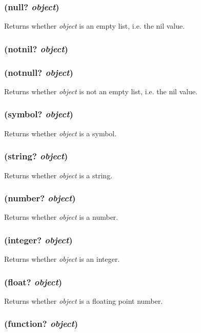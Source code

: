 \documentclass{article}
\begin{document}
\subsubsection{(null? \emph{object})}

Returns whether \emph{object} is an empty list, i.e. the nil value.

\subsubsection{(notnil? \emph{object})}

\subsubsection{(notnull? \emph{object})}

Returns whether \emph{object} is not an empty list, i.e. the nil value.

\subsubsection{(symbol? \emph{object})}

Returns whether \emph{object} is a symbol.

\subsubsection{(string? \emph{object})}

Returns whether \emph{object} is a string.

\subsubsection{(number? \emph{object})}

Returns whether \emph{object} is a number.

\subsubsection{(integer? \emph{object})}

Returns whether \emph{object} is an integer.

\subsubsection{(float? \emph{object})}

Returns whether \emph{object} is a floating point number.

\subsubsection{(function? \emph{object})}
\end{document}
